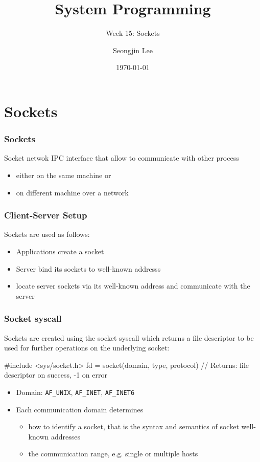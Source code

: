 \documentclass[newPxFont,sthlmFooter,nooffset]{beamer}
\title{System Programming}
\subtitle{Week 15: Sockets}
\author[SJL]{Seongjin Lee}
\institute{\href{mailto:insight@gnu.ac.kr}{insight@gnu.ac.kr}\\\url{http://open.gnu.ac.kr}\\Systems Research Lab.\\Gyeongsang National University}
\date{\today}
\begin{document}
\frame[plain]{\titlepage}




\section{Sockets}

\begin{frame}[t, fragile]
  \frametitle{Sockets}
Socket netwok IPC interface that allow to communicate with other process
\begin{itemize}
\item either on the same machine or
\item on different machine over a network
\end{itemize}
\end{frame}


\begin{frame}[t, fragile]
  \frametitle{Client-Server Setup}
Sockets are used as follows:
\begin{itemize}
\item Applications create a socket
\item Server bind its sockets to well-known addresss
\item locate server sockets via its well-known address and communicate with the server
\end{itemize}


\end{frame}


\begin{frame}[t, fragile]
  \frametitle{Socket syscall}
Sockets are created using the socket syscall which returns a file descriptor to be used for further operations on the underlying socket:

\begin{codedef}
#include <sys/socket.h>
fd = socket(domain, type, protocol)
// Returns: file descriptor on success, -1 on error
\end{codedef}


\begin{itemize}
\item Domain: \texttt{AF\_UNIX}, \texttt{AF\_INET}, \texttt{AF\_INET6}
\item Each communication domain determines
  \begin{itemize}
  \item how to identify a socket, that is the syntax and semantics of socket well-known addresses
  \item the communication range, e.g. single or multiple hosts
  \end{itemize}
\end{itemize}

\end{frame}
\end{document}
